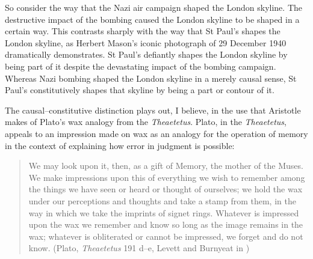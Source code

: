 So consider the way that the Nazi air campaign shaped the London skyline. The destructive impact of the bombing caused the London skyline to be shaped in a certain way. This contrasts sharply with the way that St Paul's shapes the London skyline, as Herbert Mason's iconic photograph of 29 December 1940 dramatically demonstrates. St Paul's defiantly shapes the London skyline by being part of it despite the devastating impact of the bombing campaign. Whereas Nazi bombing shaped the London skyline in a merely causal sense, St Paul's constitutively shapes that skyline by being a part or contour of it.

The causal--constitutive distinction plays out, I believe, in the use that Aristotle makes of Plato's wax analogy from the \emph{Theaetetus}. Plato, in the \emph{Theaetetus}, appeals to an impression made on wax as an analogy for the operation of memory in the context of explaining how error in judgment is possible:
\begin{quote}
	We may look upon it, then, as a gift of Memory, the mother of the Muses. We make impressions upon this of everything we wish to remember among the things we have seen or heard or thought of ourselves; we hold the wax under our perceptions and thoughts and take a stamp from them, in the way in which we take the imprints of signet rings. Whatever is impressed upon the wax we remember and know so long as the image remains in the wax; whatever is obliterated or cannot be impressed, we forget and do not know. (Plato, \emph{Theaetetus} 191 d--e, Levett and Burnyeat in \citealt[212]{Cooper:1997fk})
\end{quote}

